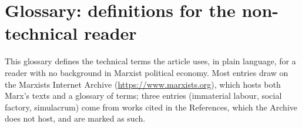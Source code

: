 \documentclass[11pt]{article}
\begin{document}
\section*{Glossary: definitions for the non-technical reader}

This glossary defines the technical terms the article uses, in plain
language, for a reader with no background in Marxist political economy.
Most entries draw on the Marxists Internet Archive
(\url{https://www.marxists.org}), which hosts both Marx's texts and a
glossary of terms; three entries (immaterial labour, social factory,
simulacrum) come from works cited in the References, which the Archive
does not host, and are marked as such.
\end{document}
